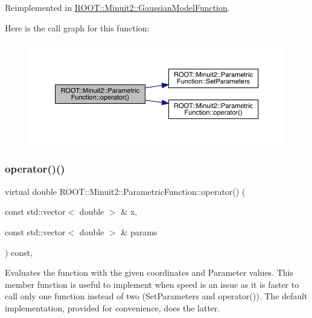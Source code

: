 Reimplemented in \mbox{\hyperlink{classROOT_1_1Minuit2_1_1GaussianModelFunction_ab74ced8f50ef3831c8142de54877e726}{R\+O\+O\+T\+::\+Minuit2\+::\+Gaussian\+Model\+Function}}.

Here is the call graph for this function\+:
\nopagebreak
\begin{figure}[H]
\begin{center}
\leavevmode
\includegraphics[width=350pt]{d3/d76/classROOT_1_1Minuit2_1_1ParametricFunction_a5fab6e804e0f93bd593580f582b0f7c5_cgraph}
\end{center}
\end{figure}
\mbox{\label{classROOT_1_1Minuit2_1_1ParametricFunction_a5fab6e804e0f93bd593580f582b0f7c5}} 
\subsubsection{\texorpdfstring{operator()()}{operator()()}\hspace{0.1cm}{\footnotesize\ttfamily [4/4]}}
{\footnotesize\ttfamily virtual double R\+O\+O\+T\+::\+Minuit2\+::\+Parametric\+Function\+::operator() (\begin{DoxyParamCaption}\item[{const std\+::vector$<$ double $>$ \&}]{x,  }\item[{const std\+::vector$<$ double $>$ \&}]{params }\end{DoxyParamCaption}) const\hspace{0.3cm}{\ttfamily [inline]}, {\ttfamily [virtual]}}

Evaluates the function with the given coordinates and Parameter values. This member function is useful to implement when speed is an issue as it is faster to call only one function instead of two (Set\+Parameters and operator()). The default implementation, provided for convenience, does the latter.


